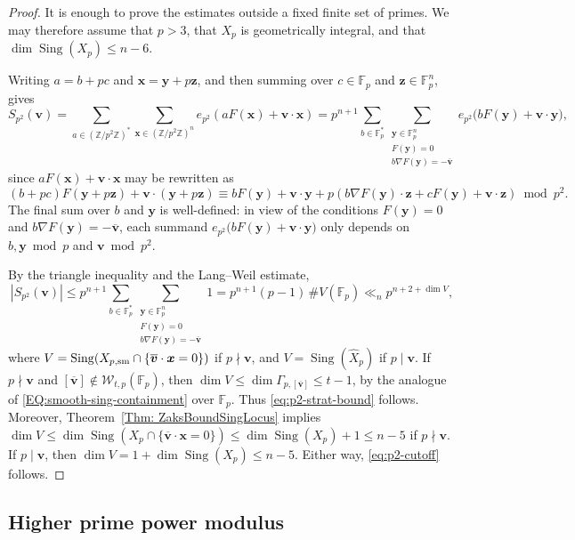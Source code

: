 \documentclass[a4paper,11pt, twoside,reqno]{amsart}
\theoremstyle{plain}
\theoremstyle{definition}
\theoremstyle{remark}
\newcommand{\bfv}{\bm{v}}
\newcommand{\bfx}{\bm{x}}
\newcommand{\bfy}{\bm{y}}
\newcommand{\bfz}{\bm{z}}
\newcommand{\ZZ}{\mathbb{Z}}
\DeclareMathOperator{\sing}{Sing}
\DeclareMathOperator{\Sing}{Sing}
\renewcommand{\bar}{\overline}
\newcommand{\x}{\bm{x}}
\renewcommand{\le}{\leqslant}
\renewcommand{\leq}{\leqslant}
\newcommand{\FF}{\mathbb{F}}
\newcommand{\cone}{\widehat}
\numberwithin{equation}{section}
\begin{document}
\begin{proof}
It is enough to prove the estimates outside a fixed finite set of primes.
We may therefore assume that
$p>3$, that $X_p$ is geometrically integral, and that $\dim\Sing(X_p)\leq n-6$.

Writing $a=b+pc$ and $\bfx=\bfy+p\bfz$,
and then summing over $c\in\FF_p$ and $\bfz\in\FF_p^n$, gives
\[
S_{p^2}(\bfv)
= \sum_{a\in (\ZZ/p^2\ZZ)^\ast}
\sum_{\bfx\in (\ZZ/p^2\ZZ)^n}e_{p^2}\left(aF(\x)+ \bfv\cdot \x\right)
= p^{n+1}
\sum_{b\in\FF_p^\ast}
\sum_{\substack{\bfy\in\FF_p^n\\
F(\bfy)=0\\
b\nabla F(\bfy)=-\bar{\bfv}}}
e_{p^2}\bigl(bF(\bfy)+\bfv\cdot\bfy\bigr),
\]
since $aF(\x)+ \bfv\cdot \x$ may be rewritten as
$$(b+pc)F(\bfy+p\bfz) + \bfv\cdot (\bfy+p\bfz)
\equiv  bF(\bfy) + \bfv\cdot \bfy
+ p\left(b\nabla F(\bfy)\cdot \bfz
+ cF(\bfy) + \bfv\cdot \bfz\right)  \bmod{p^2}.$$
The final sum over $b$ and $\bfy$ is well-defined:
in view of the conditions $F(\bfy)=0$ and $b\nabla F(\bfy)=-\bar{\bfv}$,
each summand $e_{p^2}\bigl(bF(\bfy)+\bfv\cdot\bfy\bigr)$ 
only depends on $b,\bfy\bmod{p}$ and $\bfv\bmod{p^2}$.

By the triangle inequality and the Lang--Weil estimate,
\begin{equation*}
|S_{p^2}(\bfv)|
\le p^{n+1}
\sum_{b\in\FF_p^\ast}
\sum_{\substack{\bfy\in\FF_p^n\\
F(\bfy)=0\\
b\nabla F(\bfy)=-\bar{\bfv}}} 1
= p^{n+1}
(p-1)\,
\#V(\FF_p)
\ll_n p^{n+2+\dim V},
\end{equation*}
where $V = \sing(X_{p,\rm sm} \cap \{\bar{\bfv}\cdot\bfx=0\})$ if $p\nmid \bfv$,
and $V = \sing(\cone X_p)$ if $p\mid \bfv$.
If $p\nmid\bfv$ and $[\bar{\bfv}]\notin \mathcal W_{t,p}(\FF_p)$,
then $\dim V \le \dim \Gamma_{p,[\bar{\bfv}]} \le t-1$,
by the analogue of \eqref{EQ:smooth-sing-containment} over $\FF_p$.
Thus \eqref{eq:p2-strat-bound} follows.
Moreover, Theorem~\ref{Thm: ZaksBoundSingLocus} implies
$\dim V \le \dim \sing(X_p \cap \{\bar{\bfv}\cdot\bfx=0\})
\le \dim \sing(X_p) + 1
\le n-5$ if $p\nmid \bfv$.
If $p\mid\bfv$,
then $\dim V = 1 + \dim \sing(X_p) \le n-5$.
Either way, \eqref{eq:p2-cutoff} follows.
\end{proof}

\subsection{Higher prime power modulus}
\end{document}

